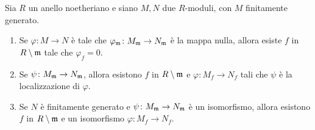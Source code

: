 \begin{lemma}\label{LmComportamentoSuSpigaSiSollevaAIntorno}
Sia $R$ un anello noetheriano e siano $M,N$ due $R$-moduli, con $M$ finitamente generato. 
\begin{enumerate}
\item Se $\varphi\colon M\to N$ è tale che $\varphi_{\mathfrak{m}}\colon M_{\mathfrak{m}} \to N_{\mathfrak{m}}$ è la mappa nulla, allora esiste $f$ in $R\setminus \mathfrak{m}$ tale che $\varphi_f=0$. 
\item Se $\psi\colon M_{\mathfrak{m}}\to N_{\mathfrak{m}}$, allora esistono $f$ in $R\setminus \mathfrak{m}$ e $\varphi\colon M_f\to N_f$ tali che $\psi$ è la localizzazione di $\varphi$.
\item Se $N$ è finitamente generato e $\psi\colon M_{\mathfrak{m}}\to N_{\mathfrak{m}}$ è un isomorfismo, allora esistono $f$ in $R\setminus \mathfrak{m}$ e un isomorfismo $\varphi\colon M_f\to N_f$.
\end{enumerate}
\end{lemma}

